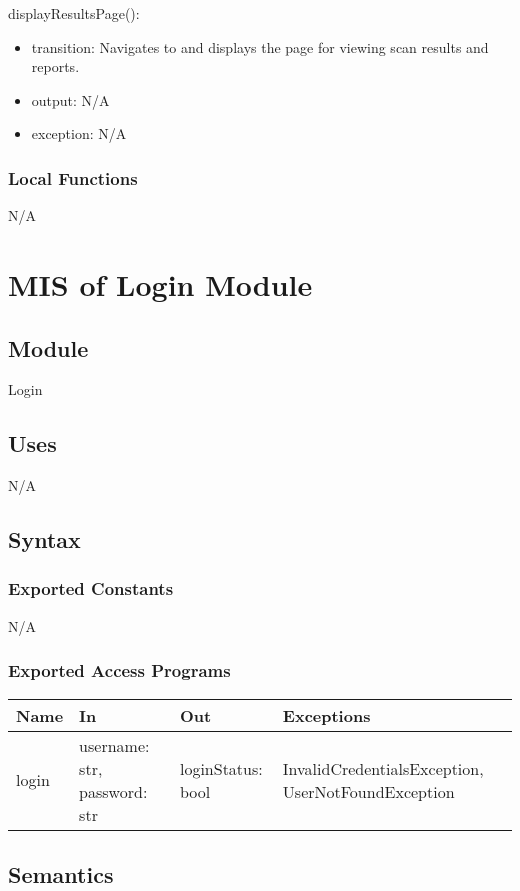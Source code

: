 \documentclass[12pt, titlepage]{article}
\begin{document}
\noindent displayResultsPage():
\begin{itemize}
  \item transition: Navigates to and displays the page for viewing scan
    results and reports.
  \item output: N/A 
  \item exception: N/A
\end{itemize}

\subsubsection{Local Functions}
N/A

\newpage

\section{MIS of Login Module} \label{Module} 
\subsection{Module}
Login
\subsection{Uses}
N/A
\subsection{Syntax}

\subsubsection{Exported Constants}
N/A
\subsubsection{Exported Access Programs}

\begin{center}
\begin{tabular}{p{2cm} p{5cm} p{4cm} p{5cm}}
\hline
\textbf{Name} & \textbf{In} & \textbf{Out} & \textbf{Exceptions} \\
\hline
login & username: str, password: str & loginStatus: bool & InvalidCredentialsException, UserNotFoundException \\
\hline
\end{tabular}
\end{center}

\subsection{Semantics}
\end{document}

